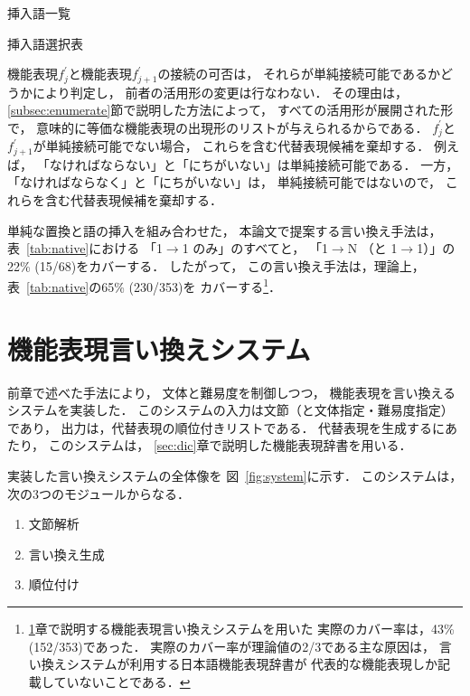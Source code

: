 \documentclass[japanese]{jnlp_1.4}
\begin{document}
\begin{table}[t]
\caption{挿入語一覧}
\label{tab:inserted}

\end{table}
\begin{table}[t]
\caption{挿入語選択表}
\label{tab:inserted_select}

\end{table}

機能表現$f_j^\prime$と機能表現$f_{j+1}^\prime$の接続の可否は，
それらが単純接続可能であるかどうかにより判定し，
前者の活用形の変更は行なわない．
その理由は，
\ref{subsec:enumerate}節で説明した方法によって，
すべての活用形が展開された形で，
意味的に等価な機能表現の出現形のリストが与えられるからである．
$f_j^\prime$と$f_{j+1}^\prime$が単純接続可能でない場合，
これらを含む代替表現候補を棄却する．
例えば，
「なければならない」と「にちがいない」は単純接続可能である．
一方，「なければならなく」と「にちがいない」は，
単純接続可能ではないので，
これらを含む代替表現候補を棄却する．

単純な置換と語の挿入を組み合わせた，
本論文で提案する言い換え手法は，
表~\ref{tab:native}における
「1$\rightarrow$1 のみ」のすべてと，
「1$\rightarrow$N （と 1$\rightarrow$1）」の22\% (15/68)をカバーする．
したがって，
この言い換え手法は，理論上，
表~\ref{tab:native}の65\% (230/353)を
カバーする\footnote{
	\ref{sec:system}章で説明する機能表現言い換えシステムを用いた
実際のカバー率は，43\% (152/353)であった．
実際のカバー率が理論値の2/3である主な原因は，
言い換えシステムが利用する日本語機能表現辞書が
代表的な機能表現しか記載していないことである．
}．




\section{機能表現言い換えシステム}
\label{sec:system}

前章で述べた手法により，
文体と難易度を制御しつつ，
機能表現を言い換えるシステムを実装した．
このシステムの入力は文節（と文体指定・難易度指定）であり，
出力は，代替表現の順位付きリストである．
代替表現を生成するにあたり，
このシステムは，
\ref{sec:dic}章で説明した機能表現辞書を用いる．

実装した言い換えシステムの全体像を
図~\ref{fig:system}に示す．
このシステムは，次の3つのモジュールからなる．
\begin{enumerate}
\item 文節解析
\item 言い換え生成
\item 順位付け
\end{enumerate}
\end{document}
